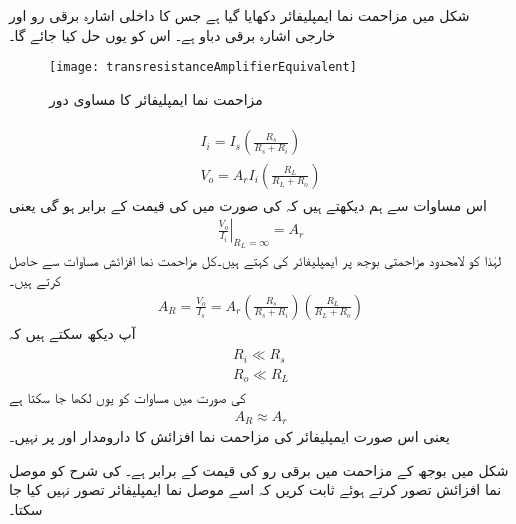 شکل  میں مزاحمت نما ایمپلیفائر دکھایا گیا ہے جس کا داخلی اشارہ برقی رو  اور خارجی اشارہ برقی دباو  ہے۔ اس کو یوں حل کیا جائے گا۔
\begin{figure}
\centering
\texttt{[image: transresistanceAmplifierEquivalent]}
\caption{مزاحمت نما ایمپلیفائر کا مساوی دور}
\label{شکل_واپسی_مزاحمت_نما_ایمپلیفائر_کا_مساوی_دور}
\end{figure}
%
\begin{gather} \label{مساوات_واپسی_مزاحمت_نما_ایمپلیفائر_کے_مساوات}
\begin{aligned}
I_i=I_s \left(\frac{R_s}{R_s+R_i}\right) \\
V_o=A_r I_i \left(\frac{R_L}{R_L+R_o}\right)
\end{aligned}
\end{gather}
اس مساوات سے ہم دیکھتے ہیں کہ  کی صورت میں  کی قیمت  کے برابر ہو گی یعنی
\begin{align}
\left . \frac{V_o}{I_i} \right |_{R_L = \infty}=A_r
\end{align}
لہٰذا  کو لامحدود مزاحمتی بوجھ پر ایمپلیفائر کی   کہتے ہیں۔کل مزاحمت نما افزائش  مساوات  سے حاصل کرتے ہیں۔
\begin{align} \label{مساوات_واپسی_کل_مزاحمت_نما}
A_R=\frac{V_o}{I_s}=A_r \left( \frac{R_s}{R_s+R_i} \right ) \left ( \frac{R_L}{R_L +R_o} \right )
\end{align}
آپ دیکھ سکتے ہیں کہ 
\begin{gather}
\begin{aligned} \label{مساوات_واپسی_حقیقی_مزاحمت_نما_ایمپلیفائر_کے_مزاحمت}
R_i \ll R_s \\
R_o \ll R_L
\end{aligned}
\end{gather}
 کی صورت میں مساوات  کو یوں لکھا جا سکتا ہے
\begin{align} \label{مساوات_واپسی_کل_مزاحمت_نما_تقریبا_اٹل_ہے}
A_R \approx A_r
\end{align}
یعنی اس صورت ایمپلیفائر کی مزاحمت نما افزائش کا دارومدار  اور  پر نہیں۔

 
شکل  میں بوجھ کے مزاحمت  میں برقی رو کی قیمت   کے برابر  ہے۔   کی شرح کو موصل نما افزائش تصور کرتے ہوئے ثابت کریں کہ اسے موصل نما ایمپلیفائر تصور نہیں کیا جا سکتا۔


